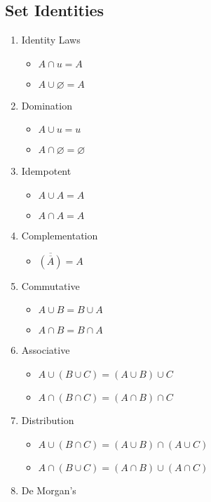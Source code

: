 \documentclass{math}
\begin{document}
\subsection*{Set Identities}
\begin{enumerate}
  \item Identity Laws
  \begin{itemize}
    \item \( A \cap u = A \)
    \item \( A \cup \varnothing = A \)
  \end{itemize}
  \item Domination
  \begin{itemize}
    \item \( A \cup u = u \)
    \item \( A \cap \varnothing = \varnothing \)
  \end{itemize}
  \item Idempotent
  \begin{itemize}
    \item \( A \cup A = A \)
    \item \( A \cap A = A \)
  \end{itemize}
  \item Complementation
  \begin{itemize}
    \item \( \overline{(\overline{A})} = A \)
  \end{itemize}
  \item Commutative
  \begin{itemize}
    \item \( A \cup B = B \cup A \)
    \item \( A \cap B = B \cap A \)
  \end{itemize}
  \item Associative
  \begin{itemize}
    \item \( A \cup (B \cup C) = (A \cup B) \cup C \)
    \item \( A \cap (B \cap C) = (A \cap B) \cap C \)
  \end{itemize}
  \item Distribution
  \begin{itemize}
    \item \( A \cup (B \cap C) = (A \cup B) \cap (A \cup C) \)
    \item \( A \cap (B \cup C) = (A \cap B) \cup (A \cap C) \)
  \end{itemize}
  \item De Morgan's

\end{enumerate}
\end{document}
